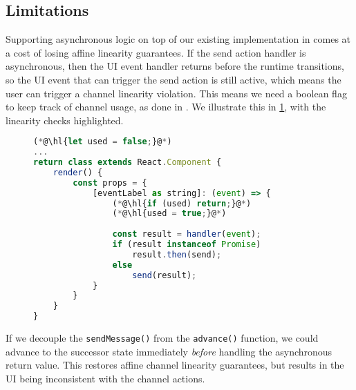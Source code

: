 \subsection{Limitations}
\label{subsection:asynclimit}

Supporting asynchronous logic on top of our
existing implementation in  comes at a cost
of losing affine linearity guarantees.
If the send action handler is asynchronous, then the UI event handler
returns before the runtime transitions, so the UI event that can trigger
the send action is still active, which means the user can trigger
a channel linearity violation. This means we need a boolean flag
to keep track of channel usage, as done in \cite{Hybrid2016}.
We illustrate this in \cref{lst:asynclinearcheck},
with the linearity checks highlighted.

\begin{figure}[!h]
\begin{lstlisting}[language=javascript,tabsize=2]
(*@\hl{let used = false;}@*)
...
return class extends React.Component {
	render() {
		const props = {
			[eventLabel as string]: (event) => {
				(*@\hl{if (used) return;}@*)
				(*@\hl{used = true;}@*)
				
				const result = handler(event);
				if (result instanceof Promise)
					result.then(send);
				else
					send(result);
			}		
		}
	}
}
\end{lstlisting}
\label{lst:asynclinearcheck}
\end{figure}

If we decouple the \texttt{sendMessage()} 
from the \texttt{advance()} function, we could advance to the successor state
immediately \textit{before} handling the asynchronous return value.
This restores affine channel linearity guarantees, but 
results in the UI being inconsistent with the channel
actions.
